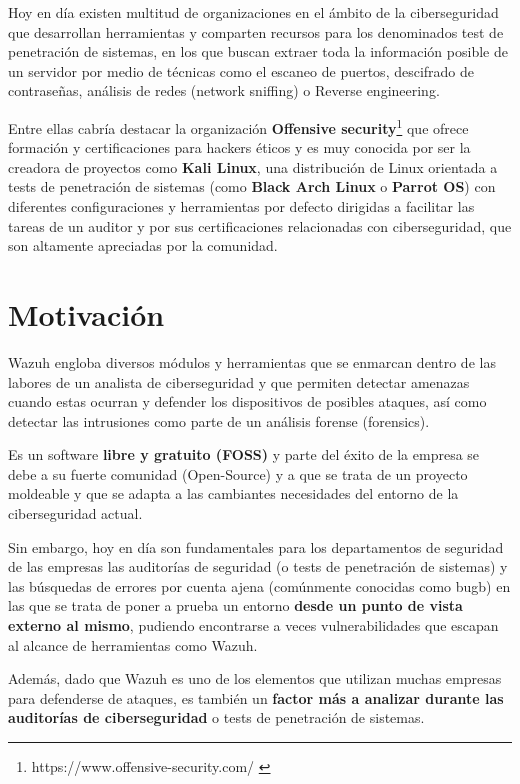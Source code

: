 Hoy en día existen multitud de organizaciones en el ámbito de la ciberseguridad que desarrollan herramientas y comparten recursos para los denominados test de penetración de sistemas, en los que buscan extraer toda la información posible de un servidor por medio de técnicas como el escaneo de puertos, descifrado de contraseñas, análisis de redes (\gls{network sniffing}) o \gls{Reverse engineering}. 

Entre ellas cabría destacar la organización \textbf{Offensive security}\footnote{https://www.offensive-security.com/ \cite{offensive}} que ofrece formación y certificaciones para hackers éticos y es muy conocida por ser la creadora de proyectos como \textbf{Kali Linux}\cite{kalilinux}, una distribución de Linux orientada a tests de penetración de sistemas (como \textbf{Black Arch Linux} o \textbf{Parrot OS}) con diferentes configuraciones y herramientas\cite{tools} por defecto dirigidas a facilitar las tareas de un auditor y por sus certificaciones relacionadas con ciberseguridad, que son altamente apreciadas por la comunidad.

\section{Motivación}

Wazuh engloba diversos módulos y herramientas que se enmarcan dentro de las labores de un analista de ciberseguridad y que permiten detectar amenazas cuando estas ocurran y defender los dispositivos de posibles ataques, así como detectar las intrusiones como parte de un análisis forense (\gls{forensics}).

Es un software \textbf{libre y gratuito (\acrshort{FOSS})} y parte del éxito de la empresa se debe a su fuerte comunidad (Open-Source) y a que se trata de un proyecto moldeable y que se adapta a las cambiantes necesidades del entorno de la ciberseguridad actual. 

Sin embargo, hoy en día son fundamentales para los departamentos de seguridad de las empresas las auditorías de seguridad (o tests de penetración de sistemas) y las búsquedas de errores por cuenta ajena (comúnmente conocidas como \gls{bugb}) en las que se trata de poner a prueba un entorno \textbf{desde un punto de vista externo al mismo}, pudiendo encontrarse a veces vulnerabilidades que escapan al alcance de herramientas como Wazuh.

Además, dado que Wazuh es uno de los elementos que utilizan muchas empresas para defenderse de ataques, es también un \textbf{factor más a analizar durante las auditorías de ciberseguridad} o tests de penetración de sistemas. 

